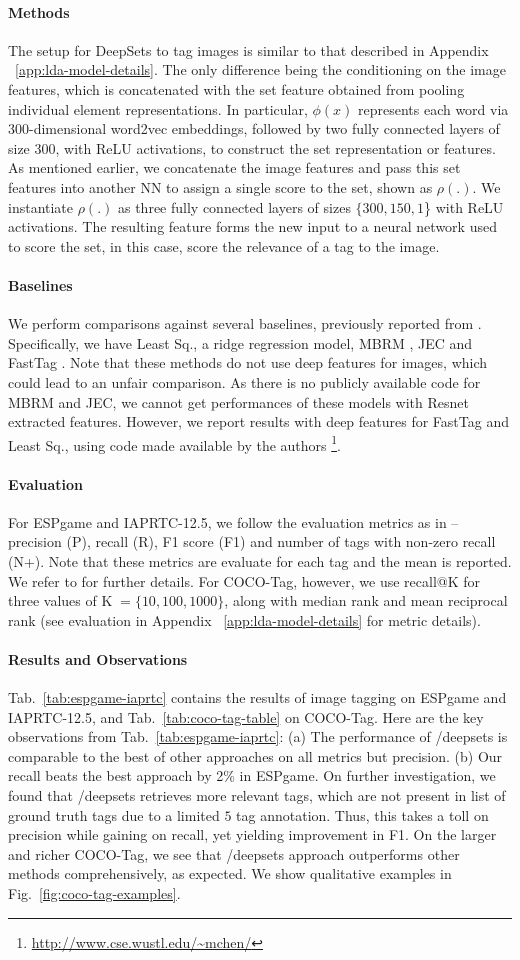 \documentclass{article}
\newcommand{\compactparagraph}[1]{\vspace*{-10pt}\paragraph{#1}}
\newcommand{\refapp}[1]{Appendix ~\ref{#1}}
\newcommand{\reffig}[1]{Fig.~\ref{#1}}
\newcommand{\reftab}[1]{Tab.~\ref{#1}}
\newcommand{\deepsets}{DeepSets\xspace}
\begin{document}
\compactparagraph{Methods}
The setup for \deepsets to tag images is similar to that described in \refapp{app:lda-model-details}.
The only difference being the conditioning on the image features, which is concatenated with the set feature obtained from pooling individual element representations.
In particular, $\phi(x)$ represents each word via $300$-dimensional word2vec embeddings, followed by two fully connected layers of size $300$, with ReLU activations, to construct the set representation or features.
As mentioned earlier, we concatenate the image features and pass this set features into another NN to assign a single score to the set, shown as $\rho(.)$.
We instantiate $\rho(.)$ as three fully connected layers of sizes $\{300, 150, 1$\} with ReLU activations.
The resulting feature forms the new input to a neural network used to score the set, in this case, score the relevance of a tag to the image.

\compactparagraph{Baselines}
We perform comparisons against several baselines, previously reported from \cite{chen2013fast}. Specifically, we have Least Sq., a ridge regression model, MBRM \cite{Feng:2004:MBR:1896300.1896446}, JEC \cite{Makadia:2008:NBI:1478172.1478199} and FastTag \cite{chen2013fast}. Note that these methods do not use deep features for images, which could lead to an unfair comparison. As there is no publicly available code for MBRM and JEC, we cannot get performances of these models with Resnet extracted features. However, we report results with deep features for FastTag and Least Sq., using code made available by the authors \footnote{\url{http://www.cse.wustl.edu/~mchen/}}.

\compactparagraph{Evaluation}
For ESPgame and IAPRTC-12.5, we follow the evaluation metrics as in \cite{guillaumin2009tagprop} -- precision (P), recall (R), F1 score (F1) and number of tags with non-zero recall (N+). Note that these metrics are evaluate for each tag and the mean is reported.  We refer to \cite{guillaumin2009tagprop} for further details. For COCO-Tag, however, we use recall@K for three values of K$\;=\{10, 100, 1000\}$, along with median rank and mean reciprocal rank (see evaluation in \refapp{app:lda-model-details} for metric details).

\compactparagraph{Results and Observations}
\reftab{tab:espgame-iaprtc} contains the results of image tagging on ESPgame and IAPRTC-12.5, and \reftab{tab:coco-tag-table} on COCO-Tag. Here are the key observations from \reftab{tab:espgame-iaprtc}: (a) The performance of /deepsets is comparable to the best of other approaches on all metrics but precision. (b) Our recall beats the best approach by 2\% in ESPgame. On further investigation, we found that /deepsets retrieves more relevant tags, which are not present in list of ground truth tags due to a limited $5$ tag annotation. Thus, this takes a toll on precision while gaining on recall, yet yielding improvement in F1. On the larger and richer COCO-Tag, we see that /deepsets approach outperforms other methods comprehensively, as expected. We show qualitative examples in \reffig{fig:coco-tag-examples}.
\end{document}
